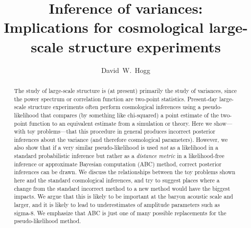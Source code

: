 \documentclass[12pt, letterpaper, preprint]{aastex}
\begin{document}
\sloppy\sloppypar\frenchspacing %

\title{Inference of variances:\\
       Implications for cosmological large-scale structure experiments}
\author{
  David~W.~Hogg
}

\begin{abstract}
The study of large-scale structure is (at present) primarily the study
of variances, since the power spectrum or correlation function are
two-point statistics.
Present-day large-scale structure experiments often perform
cosmological inferences using a pseudo-likelihood that compares
(by something like chi-squared) a
point estimate of the two-point function to an equivalent estimate
from a simulation or theory.
Here we show---with toy problems---that this procedure in general
produces incorrect posterior inferences about the variance (and
therefore cosmological parameters).
However, we also show that if a very similar pseudo-likelihood
is used
\emph{not} as a likelihood in a standard probabilistic inference but
rather as a \emph{distance metric} in a likelihood-free inference or
approximate Bayesian
computation (ABC) method, correct posterior inferences can be drawn.
We discuss the relationships between the toy problems shown here and
the standard cosmological inferences, and try to suggest places where
a change from the standard incorrect method to a new method would
have the biggest impacts.
We argue that this is likely to be important at the baryon acoustic
scale and larger, and it is likely to lead to underestimates of
amplitude parameters such as sigma-8.
We emphasize that ABC is just one of many possible replacements for
the pseudo-likelihood method.
\end{abstract}

\end{document}
